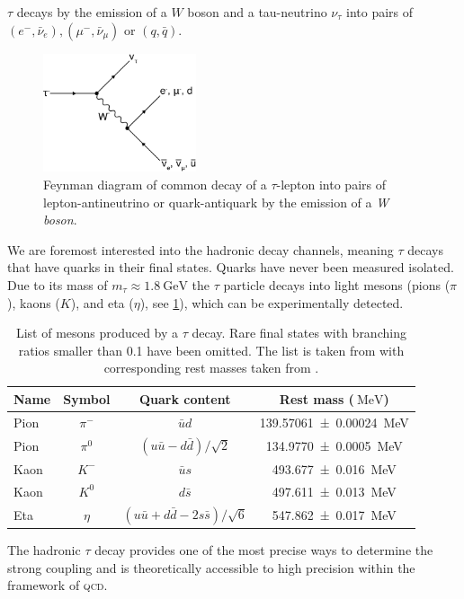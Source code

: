 \documentclass[../../index.tex]{subfiles}
\begin{document}
\(\tau\) decays by the emission of a \(W\) boson and a tau-neutrino \(\nu_\tau\)
into pairs of \((e^-, \bar\nu_e), (\mu^-, \bar\nu_\mu)\) or \((q, \bar q)\).
\begin{figure}
  \centering \includegraphics[width=0.4\textwidth]{images/tauDecay.eps}
  \caption{Feynman diagram of common decay of a \(\tau\)-lepton into pairs of
    lepton-antineutrino or quark-antiquark by the emission of a \textit{W
      boson}.}
  \label{fig:tauDecay}
\end{figure}
We are foremost interested into the hadronic decay channels, meaning \(\tau\)
decays that have quarks in their final states. Quarks have never been measured
isolated. Due to its mass of \(m_\tau \approx \SI{1.8}{\giga\electronvolt}\) the
\(\tau\) particle decays into light mesons (pions (\(\pi\)), kaons (\(K\)), and
eta (\(\eta\)), see \cref{table:lightMesons}), which can be experimentally
detected.
\begin{table}
  \centering
  \begin{tabular}{lccc}
    \toprule
    Name & Symbol & Quark content & Rest mass (\(\SI{}{\mega\electronvolt}\)) \\
    \midrule
    Pion & \(\pi^-\) & \(\bar u d\) & \SI{139.57061 \pm 0.00024}{\mega\electronvolt}  \\
    Pion & \(\pi^0\) & \((u \bar u - d \bar d)/\sqrt{2}\) & \SI{134.9770\pm0.0005}{\mega\electronvolt} \\
    Kaon & \(K^-\) & \(\bar u s\) & \SI{493.677\pm0.016}{\mega\electronvolt} \\
    Kaon & \(K^0\) & \(d \bar s\) & \SI{497.611\pm0.013}{\mega\electronvolt} \\
    Eta & \(\eta\) & \((u \bar u + d \bar d - 2 s \bar s)/\sqrt{6}\) & \SI{547.862\pm0.017}{\mega\electronvolt} \\
  \end{tabular}
  \caption{List of mesons produced by a \(\tau\) decay. Rare final states with
    branching ratios smaller than 0.1 have been omitted. The list is taken from
    \cite{Davier2006} with corresponding rest masses taken from \cite{PDG2018}.}
  \label{table:lightMesons}
\end{table}
The hadronic \(\tau\) decay provides one of the most precise ways to determine
the strong coupling \cite{Pich2016} and is theoretically accessible to high
precision within the framework of \textsc{qcd}.
\end{document}
